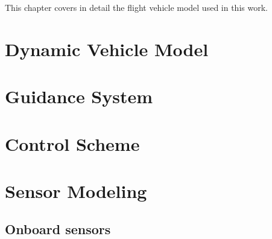 \documentclass[../Thesis.tex]{subfiles}
\begin{document}
This chapter covers in detail the flight vehicle model used in this work.

\section{Dynamic Vehicle Model}


\section{Guidance System}


\section{Control Scheme}

\section{Sensor Modeling}
\subsection{Onboard sensors}
\end{document}
